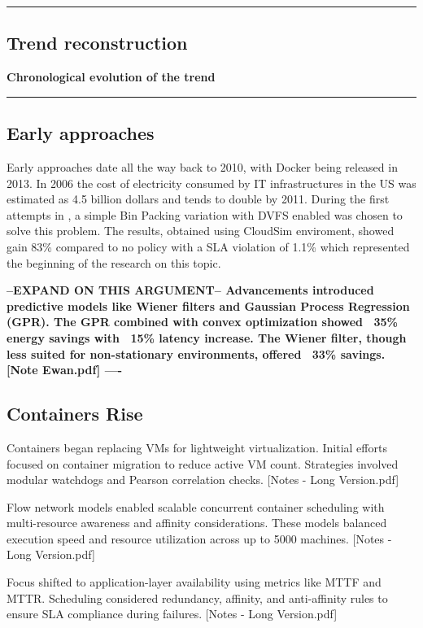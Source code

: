 {\color{gray}\hrule}
\begin{center}
\section{Trend reconstruction}
\textbf{Chronological evolution of the trend}
\bigskip
\end{center}
{\color{gray}\hrule}
\begin{multicols}{2}
\subsection{Early approaches}
Early approaches date all the way back to 2010, with Docker being released in 2013. In 2006 the cost of electricity consumed by IT infrastructures in the US was estimated as 4.5 billion dollars and tends to double by 2011\cite{beloglazov_energy_2010}.
During the first attempts in \cite{beloglazov_energy_2010}, a simple Bin Packing variation with DVFS enabled was chosen to solve this problem. The results, obtained using CloudSim enviroment, showed  gain 83\% compared to no policy with a SLA violation of 1.1\% which represented the beginning of the research on this topic.

\textbf{--EXPAND ON THIS ARGUMENT--
Advancements introduced predictive models like Wiener filters and Gaussian Process Regression (GPR). The GPR combined with convex optimization showed ~35\% energy savings with ~15\% latency increase. The Wiener filter, though less suited for non-stationary environments, offered ~33\% savings. [Note Ewan.pdf]
----
}

\subsection{Containers Rise}
Containers began replacing VMs for lightweight virtualization. Initial efforts focused on container migration to reduce active VM count. Strategies involved modular watchdogs and Pearson correlation checks. [Notes - Long Version.pdf]

Flow network models enabled scalable concurrent container scheduling with multi-resource awareness and affinity considerations. These models balanced execution speed and resource utilization across up to 5000 machines. [Notes - Long Version.pdf]


Focus shifted to application-layer availability using metrics like MTTF and MTTR. Scheduling considered redundancy, affinity, and anti-affinity rules to ensure SLA compliance during failures. [Notes - Long Version.pdf]

\end{multicols}


